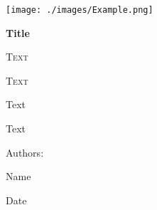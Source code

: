 \begin{titlepage}
    \centering
    \texttt{[image: ./images/Example.png]}\par
    \vspace{1cm}
    {\bfseries\LARGE Title\par}
    \vspace{0.5cm}
    {\scshape\Large Text\par}
    \vspace{2cm}
    {\scshape\Huge Text\par}
    \vspace{2cm}
    {\Huge Text\par}
    {\Large Text\par}
    \vfill
    {\Large Authors: \par}
    {\Large Name\par}
    \vfill
    {\Large Date\par}
\end{titlepage}
